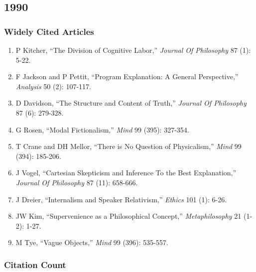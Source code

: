 \documentclass[
  10pt,
  letterpaper,
  DIV=11,
  numbers=noendperiod,
  twoside]{scrartcl}
\providecommand{\tightlist}{%
  \setlength{\itemsep}{0pt}\setlength{\parskip}{0pt}}\usepackage{longtable,booktabs,array}
\begin{document}
\newpage

\subsection{1990}\label{sec-s1990}

\subsubsection*{Widely Cited Articles}\label{widely-cited-articles-14}

\begin{enumerate}
\def\labelenumi{\arabic{enumi}.}
\tightlist
\item
  P Kitcher, ``The Division of Cognitive Labor,'' \emph{Journal Of
  Philosophy} 87 (1): 5-22.
\item
  F Jackson and P Pettit, ``Program Explanation: A General
  Perspective,'' \emph{Analysis} 50 (2): 107-117.
\item
  D Davidson, ``The Structure and Content of Truth,'' \emph{Journal Of
  Philosophy} 87 (6): 279-328.
\item
  G Rosen, ``Modal Fictionalism,'' \emph{Mind} 99 (395): 327-354.
\item
  T Crane and DH Mellor, ``There is No Question of Physicalism,''
  \emph{Mind} 99 (394): 185-206.
\item
  J Vogel, ``Cartesian Skepticism and Inference To the Best
  Explanation,'' \emph{Journal Of Philosophy} 87 (11): 658-666.
\item
  J Dreier, ``Internalism and Speaker Relativism,'' \emph{Ethics} 101
  (1): 6-26.
\item
  JW Kim, ``Supervenience as a Philosophical Concept,''
  \emph{Metaphilosophy} 21 (1-2): 1-27.
\item
  M Tye, ``Vague Objects,'' \emph{Mind} 99 (396): 535-557.
\end{enumerate}

\subsubsection*{Citation Count}\label{sec-count-1990}
\end{document}
